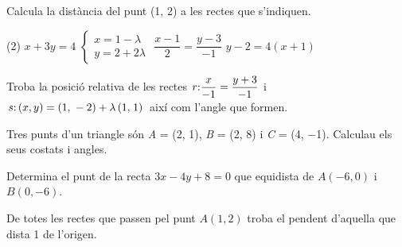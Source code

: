 \begin{mylist}
\exer   Calcula la distància del punt (1, 2) a les rectes que s'indiquen.
	\begin{tasks}(2)
		\task $x+3y=4$   \task $\left\{\begin{array}{l} {x=1-\lambda } \\ {y=2+2\lambda } \end{array}\right. $  \task $\dfrac{x-1}{2} =\dfrac{y-3}{-1} $  \task $y-2=4\left(x+1\right)$
	\end{tasks}

\answers[cols=1]{[$r:\,x+3y-4=0$; $d=\frac{3}{\sqrt{10}}$,
	$r:\,2x+y-4=0$; $d=0$,
	$r:\,x+2y-7=0$; $d=\frac{3}{\sqrt{5}}$,
	$r:\,4x-y+6=0$; $d=0$ 
	]}

\exer  Troba la posició relativa de les rectes $r{\rm :}\dfrac{x}{-{\rm 1}} =\dfrac{y+{\rm 3}}{-{\rm 1}} $ i
$s{\rm :}\left(x,y\right)=\left({\rm 1,}\; -{\rm 2}\right)+\lambda \left({\rm 1,}\; {\rm 1}\right)$
així com l'angle que formen.


\exer  Tres punts d'un triangle són  \textit{A} = (2, 1), \textit{B} = (2, 8) i \textit{C} = (4, $-$1). Calculau els seus costats i angles. 


\exer Determina el punt de la recta $3x-4y+8=0$ que equidista de $A(-6,0)$ i $B(0,-6)$.


\exer[-1] De totes les rectes que passen pel punt $A(1,2)$ troba el pendent d'aquella que dista 1 de l'origen.



\end{mylist}
\pagebreak


